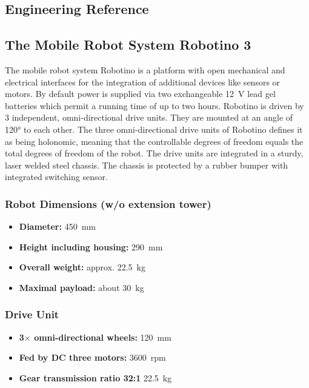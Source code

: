 \documentclass[12pt,twoside]{article}
\begin{document}
\begin{appendix}
\newpage

\section{Engineering Reference}
\label{sec:engref}
\subsection{The Mobile Robot System Robotino 3}
The mobile robot system Robotino is a platform with open mechanical
and electrical interfaces for the integration of additional devices
like sensors or motors. By default power is supplied via two
exchangeable \SI{12}{\volt} lead gel batteries which permit a running
time of up to two hours. Robotino is driven by 3 independent,
omni-directional drive units. They are mounted at an angle of
\ang{120} to each other. The three omni-directional drive units of
Robotino defines it as being holonomic, meaning that the controllable
degrees of freedom equals the total degrees of freedom of the
robot. The drive units are integrated in a sturdy, laser welded steel
chassis. The chassis is protected by a rubber bumper with integrated
switching sensor.

\subsubsection{Robot Dimensions (w/o extension tower)}
\label{apx:sec:robot}
\begin{itemize}
\item \textbf{Diameter:} \SI{450}{\milli\metre}
\item \textbf{Height including housing:} \SI{290}{\milli\metre}
\item \textbf{Overall weight:} approx. \SI{22.5}{\kilogram}
\item \textbf{Maximal payload:} about \SI{30}{\kilogram}
 \end{itemize}

\subsubsection{Drive Unit}
\begin{itemize}
\item \textbf{3$\times$ omni-directional wheels:} \SI{120}{\milli\metre}
\item \textbf{Fed by DC three motors:} \SI{3600}{rpm}
\item \textbf{Gear transmission ratio 32:1} \SI{22.5}{\kilogram}
 \end{itemize}


\end{appendix}
\end{document}
